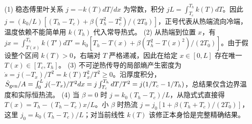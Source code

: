 (1) 稳态傅里叶关系 \(j=-k(T)dT/dx\) 为常数，积分 \(jL=\int_{T_c}^{T_h}k(T)dT\)。因此 \(j=(k_0/L)[(T_h-T_c)+\beta(T_h^2-T_c^2)/(2T_0)]\)，正号代表从热端流向冷端，温度依赖不能简单用 \(k(T_h)\) 代入常导热式。
(2) 从热端到位置 \(x\)，有 \(jx=\int_{T(x)}^{T_h}k(T')dT'=k_0[T_h-T(x)+\beta(T_h^2-T(x)^2)/(2T_0)]\)。由于假设整个区间 \(k(T)>0\)，右端对 \(T\) 严格递减，因此在给定 \(x\in[0,L]\) 存在唯一 \(T(x)\in[T_c,T_h]\)。
(3) 不可逆热传导的局部熵产生密度为 \(\dot s=j(-T_x)/T^2=k(T)T_x^2/T^2\ge0\)。沿厚度积分，\(\dot S_{\rm gen}/A=\int_0^L j(-T_x)/T^2dx=j\int_{T_c}^{T_h}dT/T^2=j(1/T_c-1/T_h)\)，总结果仅含边界温度和实际恒热流。
(4) 当 \(\beta=0\) 时 \(j=k_0(T_h-T_c)/L\)，从隐式式直接得 \(T(x)=T_h-(T_h-T_c)x/L\)。小 \(\beta\) 时热流 \(j=j_0[1+\beta(T_h+T_c)/(2T_0)]\)，这里 \(j_0=k_0(T_h-T_c)/L\)；对当前线性 \(k(T)\) 该修正本身恰是完整精确结果。
